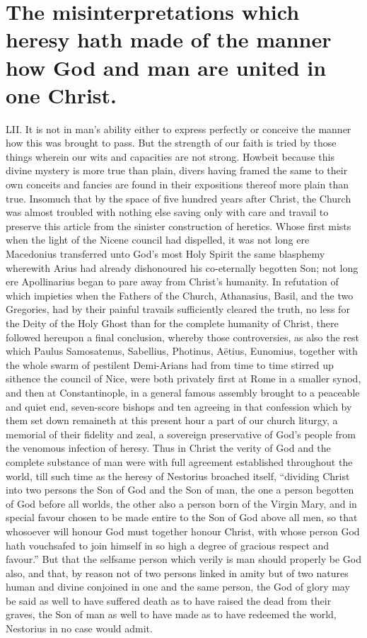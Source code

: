 \section*{The misinterpretations which heresy hath made of the manner how God and man are united in one Christ.}
LII. It is not in man’s ability either to express perfectly or conceive the manner how this was brought to pass. But the strength of our faith is tried by those things wherein our wits and capacities are not strong. Howbeit because this divine mystery is more true than plain, divers having framed the same to their own conceits and fancies are found in their expositions thereof more plain than true. Insomuch that by the space of five hundred years after Christ, the Church was almost  troubled with nothing else saving only with care and travail to preserve this article from the sinister construction of heretics. Whose first mists when the light of the Nicene council had dispelled, it was not long ere Macedonius transferred unto God’s most Holy Spirit the same blasphemy wherewith Arius had already dishonoured his co-eternally begotten Son; not long ere Apollinarius began to pare away from Christ’s humanity. In refutation of which impieties when the Fathers of the Church, Athanasius, Basil, and the two Gregories, had by their painful travails sufficiently cleared the truth, no less for the Deity of the Holy Ghost than for the complete humanity of Christ, there followed hereupon a final conclusion, whereby those controversies, as also the rest which Paulus Samosatenus, Sabellius, Photinus, Aëtius, Eunomius, together with the whole swarm of pestilent Demi-Arians had from time to time stirred up sithence the council of Nice, were both privately first at Rome in a smaller synod, and then at Constantinople, in a general famous assembly brought to a peaceable and quiet end, seven-score bishops and ten agreeing in that confession which by them set down remaineth at this present hour a part of our church liturgy, a memorial of their fidelity and zeal, a sovereign preservative of God’s people from the venomous infection of heresy.
Thus in Christ the verity of God and the complete substance of man were with full agreement established throughout the world, till such time as the heresy of Nestorius broached itself, “dividing Christ into two persons the Son of God and  the Son of man, the one a person begotten of God before all worlds, the other also a person born of the Virgin Mary, and in special favour chosen to be made entire to the Son of God above all men, so that whosoever will honour God must together honour Christ, with whose person God hath vouchsafed to join himself in so high a degree of gracious respect and favour.” But that the selfsame person which verily is man should properly be God also, and that, by reason not of two persons linked in amity but of two natures human and divine conjoined in one and the same person, the God of glory may be said as well to have suffered death as to have raised the dead from their graves, the Son of man as well to have made as to have redeemed the world, Nestorius in no case would admit.
